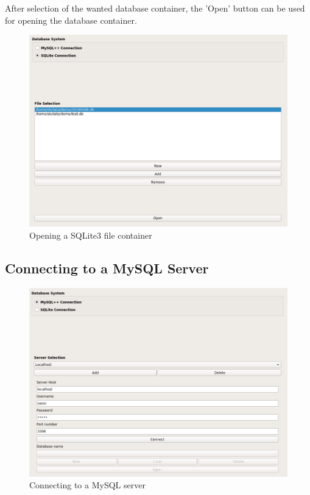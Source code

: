 After selection of the wanted database container, the 'Open' button can be used for opening the database container.

\begin{figure}[H]
  \center
    \includegraphics[width=16cm,frame]{../screenshots/sqlite3_open.png}
  \caption{Opening a SQLite3 file container}
  \label{fig:sqlite3_open}
\end{figure} 


\subsection{Connecting to a MySQL Server}
\label{sec:mysql_connect}

\begin{figure}[H]
  \center
    \includegraphics[width=16cm,frame]{../screenshots/mysql_server_selection.png}
  \caption{Connecting to a MySQL server}
  \label{fig:mysql_connect}
\end{figure}

